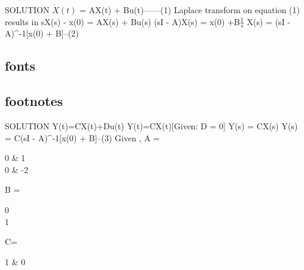 \documentclass[15pt]{beamer}
\begin{document}
\def\beamer@mytheme@style{green}
\begin{frame}[fragile]{SOLUTION}
		$\dot X(t)$ = AX(t) + Bu(t)\hspace{70pt}------(1)
		\newline \newline Laplace transform on equation (1) results in 
		\newline \newline sX(s) - x(0) \hspace{5pt}= \hspace{5pt}AX(s) + Bu(s)
		\newline \newline (sI - A)X(s) \hspace{5pt}= \hspace{5pt}x(0) +B$\frac{1}{s}$
		\newline \newline X(s)\hspace{5pt} = \hspace{5pt}(sI - A)^{-1}[x(0) + B]\hspace{55pt}--(2)
		
\end{frame}

\subsection{fonts}

\subsection{footnotes}

\begin{frame}{SOLUTION}
        Y(t)=CX(t)+Du(t)
        \newline\newline Y(t)=CX(t)\hspace{70pt}[Given: D = 0]
	    \newline\newline Y(s) = CX(s)
	    \newline\newline Y(s) = C(sI - A)^{-1}[x(0) + B]\hspace{55pt}--(3)
	    \newline\newline Given ,\newline 
	\newline \hspace{10pt}A = \begin{bmatrix}0 & 1\\0 & -2\end{bmatrix}\hspace{5pt}B = \begin{bmatrix}0\\1\end{bmatrix}\hspace{5pt}C=\begin{bmatrix}1 & 0 \end{bmatrix}
\end{frame}
\end{document}
